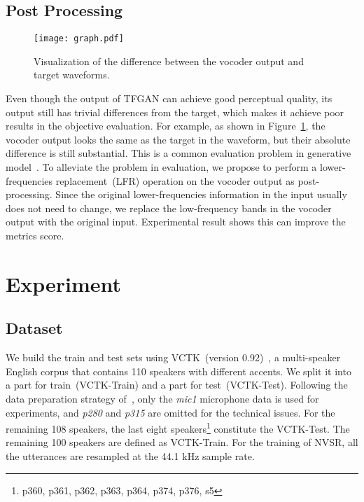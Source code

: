 \documentclass[a4paper]{article}
\def\Figref#1{Figure~\ref{#1}}
\begin{document}
\subsection{Post Processing} 

\begin{figure}[htbp] \centering
  \texttt{[image: graph.pdf]}
  \caption{Visualization of the difference between the vocoder output and target waveforms.}
  \label{fig-postprocess-method}
\end{figure}

Even though the output of TFGAN can achieve good perceptual quality, its output still has trivial differences from the target, which makes it achieve poor results in the objective evaluation. For example, as shown in \Figref{fig-postprocess-method}, the vocoder output looks the same as the target in the waveform, but their absolute difference is still substantial. This is a common evaluation problem in generative model~\cite{nu-gan-kumar2020nu, liu2019speech, liu2021conditional}. To alleviate the problem in evaluation, we propose to perform a lower-frequencies replacement~(LFR) operation on the vocoder output as post-processing. Since the original lower-frequencies information in the input usually does not need to change, we replace the low-frequency bands in the vocoder output with the original input. Experimental result shows this can improve the metrics score.

\section{Experiment}
\label{sec:experiment}
\subsection{Dataset}
We build the train and test sets using VCTK~(version 0.92)~\cite{vctk-yamagishi2019cstr}, a multi-speaker English corpus that contains \num{110} speakers with different accents. We split it into a part for train~(VCTK-Train) and a part for test~(VCTK-Test). Following the data preparation strategy of~\cite{nu-wave-lee2021nu}, only the \textit{mic1} microphone data is used for experiments, and \textit{p280} and \textit{p315} are omitted for the technical issues. For the remaining 108 speakers, the last eight speakers\footnote{p360, p361, p362, p363, p364, p374, p376, s5} constitute the VCTK-Test. The remaining \num{100} speakers are defined as VCTK-Train. For the training of NVSR, all the utterances are resampled at the \num{44.1} kHz sample rate. 
\end{document}
